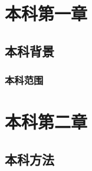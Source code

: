 \documentclass[degree=bachelor, fontset=fandol]{nwputhesis}
\begin{document}
\START
\showoutput

\frontmatter
\tableofcontents

\mainmatter
\chapter{本科第一章}
\section{本科背景}
\subsection{本科范围}

\chapter{本科第二章}
\section{本科方法}

\clearpage
\OMIT
\end{document}
